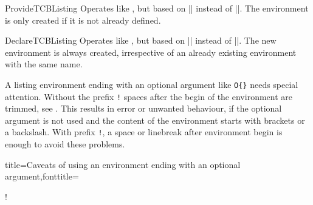 \begin{docCommand}{ProvideTCBListing}{}
  Operates like , but based on |\ProvideDocumentEnvironment| instead of |\NewDocumentEnvironment|.
  The environment  is only created if it is not already defined.
\end{docCommand}

\begin{docCommand}{DeclareTCBListing}{}
  Operates like , but based on |\DeclareDocumentEnvironment| instead of |\NewDocumentEnvironment|.
  The new environment is always created, irrespective of an already existing
  environment with the same name.
\end{docCommand}

\clearpage

\begin{marker}
A listing environment ending with an optional argument like \verb+O{}+
needs special attention. Without the prefix \flqq\verb+!+\frqq{} spaces after
the begin of the environment are trimmed, see \cite{latexproject:usrguide}.
This results in error or unwanted
behaviour, if the optional argument is not used and the content of the
environment starts with brackets or a backslash.
With prefix \flqq\verb+!+\frqq, a space or linebreak
after environment begin is enough to
avoid these problems.
\end{marker}

\begin{dispListing*}{title={Caveats of using an environment ending with an
  optional argument},fonttitle=\bfseries}

\begin{mybox}[colframe=red]
\good
\end{mybox}

\begin{mybox}[colframe=red]\good\end{mybox}

\begin{mybox}
\good
\end{mybox}

\begin{mybox} \good\end{mybox}

\begin{mybox}\bad!\end{mybox}

\begin{mybox}
[\good]
\end{mybox}

\begin{mybox} [\good]\end{mybox}

\begin{mybox}[\bad!]\end{mybox}
\end{dispListing*}


